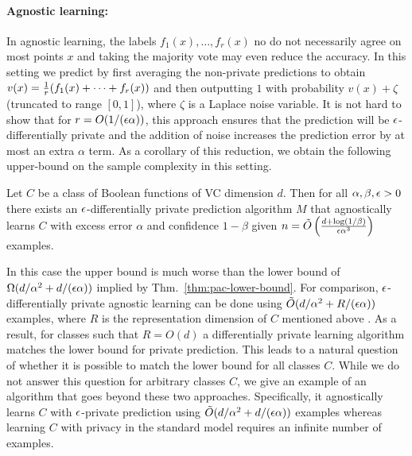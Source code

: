 \documentclass[final,12pt]{colt2018}
\begin{document}
\paragraph{Agnostic learning:}
In agnostic learning, the labels $f_1(x),\ldots,f_r(x)$ no do not necessarily agree on most points $x$ and taking the majority vote may even reduce the accuracy. In this setting we predict by first averaging the non-private predictions to obtain $v(x)=\frac{1}{r}(f_1(x)+\cdots+f_r(x))$ and then outputting $1$ with probability $v(x) + \zeta$ (truncated to range $[0,1]$), where $\zeta$ is a Laplace noise variable. It is not hard to show that for $r=O(1/(\epsilon\alpha))$, this approach ensures that the prediction will be $\epsilon$-differentially private and the addition of noise increases the prediction error by at most an extra $\alpha$ term. As a corollary of this reduction, we obtain the following upper-bound on the sample complexity in this setting.
\begin{cor}
\label{cor:agnostic-sample-complexity-intro}
Let $C$ be a class of Boolean functions of VC dimension $d$. Then for all $\alpha,\beta,\epsilon > 0$ there exists an $\epsilon$-differentially private prediction algorithm $M$ that agnostically learns $C$ with excess error $\alpha$ and confidence $1-\beta$ given $n = \tilde O\left(\frac{d  + \log(1/\beta)}{\epsilon\alpha^3}\right)$ examples.
\end{cor}
In this case the upper bound is much worse than the lower bound of $\Omega(d/\alpha^2 + d/(\epsilon\alpha))$ implied by Thm.~\ref{thm:pac-lower-bound}. For comparison, $\epsilon$-differentially private agnostic learning can be done using $\tilde O(d/\alpha^2 + R/(\epsilon\alpha))$ examples, where $R$ is the representation dimension of $C$ mentioned above \citep{BeimelNS:13,FeldmanXiao15}. As a result, for classes such that $R=O(d)$ a differentially private learning algorithm matches the lower bound for private prediction. This leads to a natural question of whether it is possible to match the lower bound for all classes $C$. While we do not answer this question for arbitrary classes $C$, we give an example of an algorithm that goes beyond these two approaches. Specifically, it agnostically learns $C$ with $\epsilon$-private prediction using $\tilde O(d/\alpha^2 + d/(\epsilon\alpha))$ examples whereas learning $C$ with privacy in the standard model requires an infinite number of examples.
\end{document}
